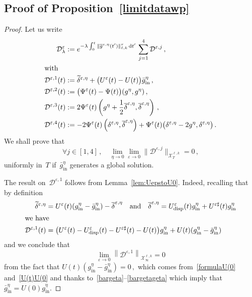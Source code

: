 \documentclass[11pt]{article}
\theoremstyle{definition}
\numberwithin{equation}{section}
\numberwithin{figure}{section}
\numberwithin{table}{section}
\newcommand*{\dd}{\mathrm{d}}
\newcommand*{\dt}{\dd t}
\newcommand*\eps{{\varepsilon}}
\newcommand*\e{{\varepsilon}}
\DeclareMathOperator{\inn}{in}
\DeclareMathOperator{\disp}{disp}
\let\oldforall\forall
\renewcommand*{\forall}{\mathrel{\oldforall}}
\begin{document}
\subsection{Proof of Proposition~\ref{limitdatawp}} \label{sec:Deps}
\begin{proof}
Let us write
\begin{align*}
\mathcal{D}_\lambda^{\e} & :=e^{-\lambda \int_0^t \|\overline g^{\eps,\eta}(t')\|_{\ell,k}^r\, \dt' \, } \sum_{j=1}^4 {\mathcal D} ^{\eps,j} \,,\\
\intertext{with}
{\mathcal D} ^{\eps,1}(t) & := \widetilde \delta^{\eps,\eta} + \big(U^\eps (t) - U (t)\big){\bar g_{{\inn}}^\eta} \,, \\
{\mathcal D} ^{\eps,2}(t) & := \big(\Psi^\eps (t) - \Psi(t) \big) (g^\eta,g^\eta) \,,\\
{\mathcal D} ^{\eps,3}(t) & :=2 \Psi^\eps (t) \left({g^\eta+\frac 12 \overline\delta^{\eps,\eta}}, \overline\delta^{\eps,\eta}\right) \,, \\
{\mathcal D} ^{\eps,4}(t) & :=- 2\Psi^\eps (t) \left(\delta^{\e,\eta}, \overline\delta^{\eps,\eta}\right) +\Psi^\eps (t)
\big(\delta^{\eps,\eta} -2{g^\eta}, \delta^{\eps,\eta}
\big)
\,.
\end{align*}
We shall prove that
\[
\forall j \in [1,4] \,, \quad \lim_{\eta\to0} \lim_{\eps\to0} \| {\mathcal D} ^{\eps,j}\|_{\mathcal{X}_T^{\ell,k}} = 0 \,,
\]
uniformly in~$T$ if~$\bar g^\eta_{\inn}$ generates a global solution.

The result on~$ {\mathcal D}^{\eps,1}$ follows from Lemma~\ref{lem:UepstoU0}. Indeed, recalling that by definition
\begin{align*}
\widetilde \delta^{\eps,\eta} &= U^\eps(t) (g_{\inn}^\eta - \bar g^\eta_{{\inn}}) - \overline\delta^{\eps,\eta}
\quad \text{and}\quad \overline\delta^{\eps,\eta} = U^\eps_{\disp}(t) g^\eta_{{\inn}} + U^{\eps \sharp}(t)g^\eta_{{\inn}}\\
\intertext{we have}
{\mathcal D} ^{\eps,1}(t) &= \big(U^\eps (t) - U^\eps_{\disp}(t) - U^{\eps \sharp}(t)- U (t)\big) g^\eta_{{\inn}} + U (t) (g_{\inn}^\eta - \bar g^\eta_{{\inn}})
\end{align*}
and we conclude that
\[
\lim_{\eps\to0} \left\| {\mathcal D} ^{\eps,1} \right\|_{\mathcal{X}_\infty^{\ell,k}} = 0
\]
from the fact that {$ U (t) (g_{\inn}^\eta - \bar g^\eta_{{\inn}}) = 0 \,, $ which comes from~\eqref{formulaU(0} and~\eqref{U(t)U(0} and thanks to~\eqref{bargeta}--\eqref{bargetageta} which imply that~$\bar g^\eta_{{\inn}} = U(0) g^\eta_{{\inn}}$.}


\end{proof}
\end{document}

